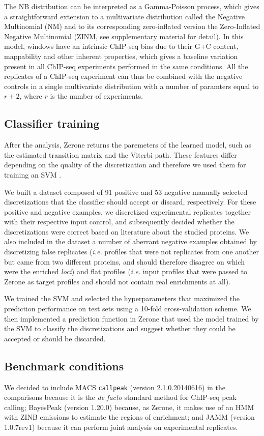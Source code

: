 \documentclass{bioinfo}
\begin{document}
\begin{methods}
The NB distribution can be interpreted as a Gamma-Poisson process,
which gives a straightforward extension to a multivariate
distribution called the Negative Multinomial (NM) and to its
corresponding zero-inflated version the Zero-Inflated Negative
Multinomial (ZINM, see supplementary material for detail). In this model,
windows have an intrinsic ChIP-seq bias due to their G+C content,
mappability and other inherent properties, which gives a baseline
variation present in all ChIP-seq experiments performed in the same
conditions. All the replicates of a ChIP-seq experiment can thus be
combined with the negative controls in a single multivariate distribution
with a number of paramters equal to $r+2$, where $r$ is the number of
experiments.

\subsection{Classifier training}
After the analysis, Zerone returns the paremeters of the learned model, such as
the estimated transition matrix and the Viterbi path. These
features differ depending on the quality of the discretization and therefore we
used them for training an SVM \citep{Chang2011,e1071}.

We built a dataset composed of 91 positive and 53 negative manually selected
discretizations that the classifier should accept or discard, respectively.
For these positive and negative examples, we discretized experimental replicates
together with their respective input control, and subsequently decided whether
the discretizations were correct based on literature about the studied proteins.
We also included in the dataset a number of aberrant negative examples obtained
by discretizing false replicates (\textit{i.e.} profiles that were not
replicates from one another but came from two different proteins, and should
therefore disagree on which were the enriched \textit{loci}) and flat profiles
(\textit{i.e.} input profiles that were passed to Zerone as target profiles and
should not contain real enrichments at all).

We trained the SVM and selected the hyperparameters that maximized the
prediction performance on test sets using a 10-fold cross-validation scheme. We
then implemented a prediction function in Zerone that used the model trained by
the SVM to classify the discretizations and suggest whether they could be
accepted or should be discarded.

\subsection{Benchmark conditions}
We decided to include MACS \texttt{callpeak} (version 2.1.0.20140616) in
the comparisons because it is the \textit{de facto} standard method
for ChIP-seq peak calling; BayesPeak (version 1.20.0) because, as Zerone,
it makes use of an HMM with ZINB emissions to estimate the regions of
enrichment; and JAMM (version 1.0.7rev1) because it can perform joint
analysis on experimental replicates.


\end{methods}
\end{document}
